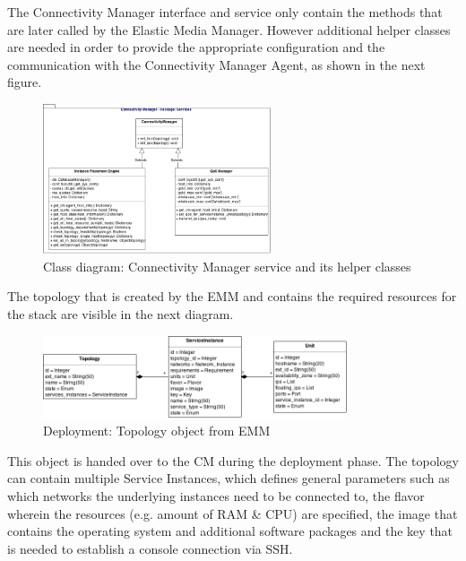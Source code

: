 The Connectivity Manager interface and service only contain the methods that are later called by the Elastic Media Manager. However additional helper classes are needed in order to provide the appropriate configuration and the communication with the Connectivity Manager Agent, as shown in the next figure.

\begin{figure}[H]
\centering

\includegraphics[width=0.6\textwidth]{images/design/cm_class_diagram}

\caption{Class diagram: Connectivity Manager service and its helper classes}
\end{figure}

The topology that is created by the EMM and contains the required resources for the stack are visible in the next diagram.

\begin{figure}[H]
\centering

\includegraphics[width=0.8\textwidth]{images/design/cm_topology_object}

\caption{Deployment: Topology object from EMM}
\end{figure}

This object is handed over to the CM during the deployment phase. The topology can contain multiple Service Instances, which defines general parameters such as which networks the underlying instances need to be connected to, the flavor wherein the resources (e.g. amount of RAM \& CPU) are specified, the image that contains the operating system and additional software packages and the key that is needed to establish a console connection via SSH.

